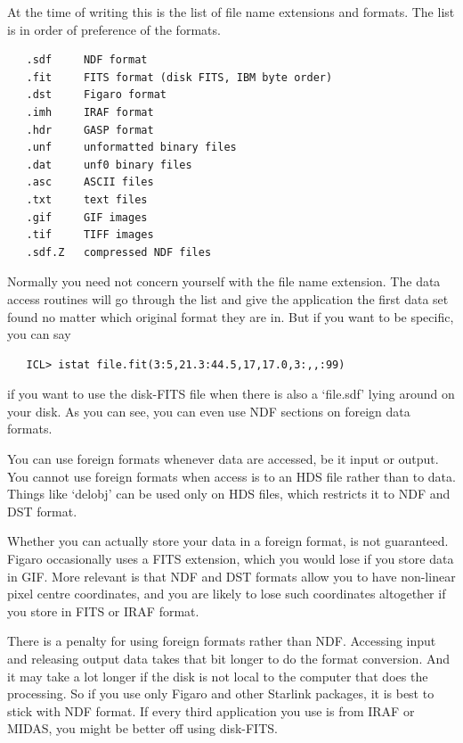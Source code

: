 \documentclass[11pt,twoside]{article}
\newcommand{\htmlref}[2]{#1}
\begin{document}
   At the time of writing this is the list of file name extensions and
   formats. The list is in order of preference of the formats.

\begin{verbatim}
   .sdf     NDF format
   .fit     FITS format (disk FITS, IBM byte order)
   .dst     Figaro format
   .imh     IRAF format
   .hdr     GASP format
   .unf     unformatted binary files
   .dat     unf0 binary files
   .asc     ASCII files
   .txt     text files
   .gif     GIF images
   .tif     TIFF images
   .sdf.Z   compressed NDF files
\end{verbatim}

   Normally you need not concern yourself with the file name
   extension. The data access routines will go through the list and
   give the application the first data set found no matter which
   original format they are in. But if you want to be specific, you
   can say

\begin{verbatim}
   ICL> istat file.fit(3:5,21.3:44.5,17,17.0,3:,,:99)
\end{verbatim}

   if you want to use the disk-FITS file when there is also a
   `file.sdf' lying around on your disk. As you can see, you can even
   use \htmlref{NDF sections}{filesndfsect} on foreign data formats.

   You can use foreign formats whenever data are accessed, be it input
   or output. You cannot use foreign formats when access is to an HDS
   file rather than to data. Things like `delobj' can be used only on
   HDS files, which restricts it to NDF and DST format.

   Whether you can actually store your data in a foreign format, is
   not guaranteed. Figaro occasionally uses a FITS extension, which you
   would lose if you store data in GIF. More relevant is that NDF and
   DST formats allow you to have non-linear pixel centre coordinates,
   and you are likely to lose such coordinates altogether if you store
   in FITS or IRAF format.

   There is a penalty for using foreign formats rather than NDF.
   Accessing input and releasing output data takes that bit longer to
   do the format conversion. And it may take a lot longer if the disk
   is not local to the computer that does the processing. So if you
   use only Figaro and other Starlink packages, it is best to stick
   with NDF format. If every third application you use is from IRAF
   or MIDAS, you might be better off using disk-FITS.
\end{document}
